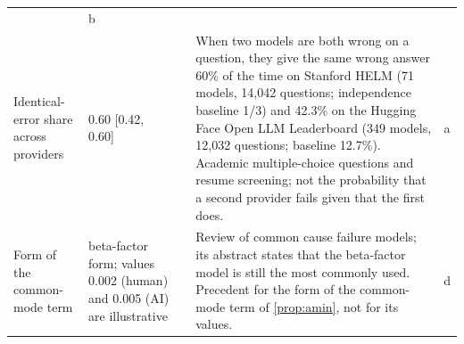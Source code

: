 \begin{longtable}{@{}Q{2.9cm}Q{2.5cm}Q{2.5cm}Q{6.4cm}c@{}}
& b\\
Identical-error share across providers
& 0.60 [0.42, 0.60]
& \citet{kim2025correlated}
& When two models are both wrong on a question, they give the same wrong answer 60\% of the time on Stanford HELM (71 models, 14,042 questions; independence baseline 1/3) and 42.3\% on the Hugging Face Open LLM Leaderboard (349 models, 12,032 questions; baseline 12.7\%). Academic multiple-choice questions and resume screening; not the probability that a second provider fails given that the first does.
& a\\
Form of the common-mode term
& beta-factor form; values 0.002 (human) and 0.005 (AI) are illustrative
& \citet{hokstad2008common}
& Review of common cause failure models; its abstract states that the beta-factor model is still the most commonly used. Precedent for the form of the common-mode term of \autoref{prop:amin}, not for its values.
& d\\


\end{longtable}
